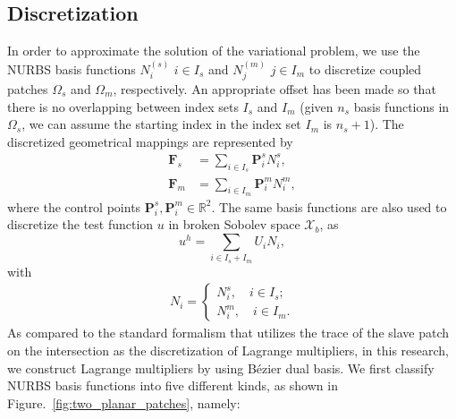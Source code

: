 \documentclass[preprint,12pt]{elsarticle}
\newcommand{\Bezier}{{B\'{e}zier} }
\theoremstyle{remark}
\begin{document}
\subsection{Discretization}
In order to approximate the solution of the variational problem, we use the NURBS basis functions $N^{(s)}_i$ $i\in{I_s}$ and $N^{(m)}_j$ $j\in{I_m}$ to discretize coupled patches $\Omega_s$ and $\Omega_m$, respectively. An appropriate offset has been made so that there is no overlapping between index sets $I_s$ and $I_m$ (given $n_s$ basis functions in $\Omega_s$, we can assume the starting index in the index set $I_m$ is $n_s+1$). The discretized geometrical mappings are represented by
\begin{align}
    \mathbf{F}_s&=\sum_{i\in{I_s}}\mathbf{P}_i^sN_i^s,\\
    \mathbf{F}_m&=\sum_{i\in{I_m}}\mathbf{P}_i^mN_i^m,
\end{align}
where the control points $\mathbf{P}_i^s,\mathbf{P}_i^m\in\mathbb{R}^2$. The same basis functions are also used to discretize the test function $u$ in broken Sobolev space $\mathcal{X}_b$, as
\begin{equation}
    u^h=\sum_{i\in{I_s+I_m}}U_iN_i,
\end{equation}
with
\begin{align}
    N_i=
    \begin{cases}
        N_i^s, \quad i\in{I_s};\\
        N_i^m, \quad i\in{I_m}.
    \end{cases}
\end{align}
As compared to the standard formalism that utilizes the trace of the slave patch on the intersection as the discretization of Lagrange multipliers, in this research, we construct Lagrange multipliers by using \Bezier dual basis. We first classify NURBS basis functions into five different kinds, as shown in Figure.~\ref{fig:two_planar_patches}, namely:
\end{document}
